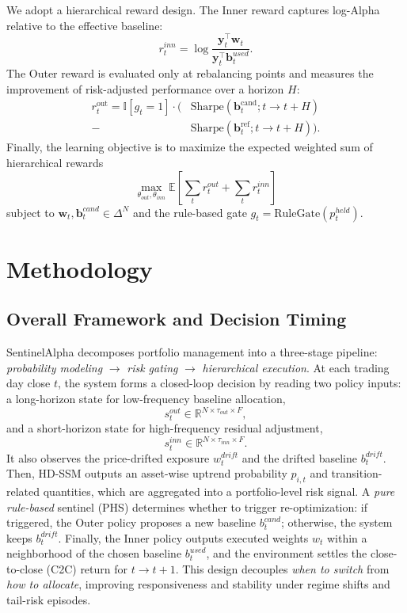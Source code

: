 \documentclass[letterpaper]{article} %
\begin{document}
We adopt a hierarchical reward design. The Inner reward captures log-Alpha relative to the effective baseline:
\begin{equation}
r_t^{inn}=\log\frac{\mathbf{y}_t^\top \mathbf{w}_t}{\mathbf{y}_t^\top \mathbf{b}^{used}_t}.
\end{equation}
The Outer reward is evaluated only at rebalancing points and measures the improvement of risk-adjusted performance over a horizon $H$:
\begin{equation}
\begin{split}
r_t^{\text{out}} = \mathbb{I}[g_t=1] \cdot \Big(
    &\mathrm{Sharpe}(\mathbf{b}_t^{\text{cand}}; t\!\to\!t+H) \\
    - &\mathrm{Sharpe}(\mathbf{b}_t^{\text{ref}}; t\!\to\!t+H)
\Big).
\end{split}
\end{equation}
Finally, the learning objective is to maximize the expected weighted sum of hierarchical rewards
\begin{equation}
\max_{\theta_{out},\theta_{inn}} \mathbb{E}\!\left[\sum_t r_t^{out}+\sum_t r_t^{inn}\right]
\end{equation}
subject to $\mathbf{w}_t,\mathbf{b}^{cand}_t\in\Delta^N$ and the rule-based gate $g_t=\mathrm{RuleGate}(p_t^{held})$.

\section{Methodology}
\subsection{Overall Framework and Decision Timing}
\label{sec:overall}

SentinelAlpha decomposes portfolio management into a three-stage pipeline:
\emph{probability modeling} $\rightarrow$ \emph{risk gating} $\rightarrow$ \emph{hierarchical execution}.
At each trading day close $t$, the system forms a closed-loop decision by reading two policy inputs:
a long-horizon state for low-frequency baseline allocation,
\begin{equation}
s_t^{out}\in\mathbb{R}^{N\times \tau_{out}\times F},
\end{equation}
and a short-horizon state for high-frequency residual adjustment,
\begin{equation}
s_t^{inn}\in\mathbb{R}^{N\times \tau_{inn}\times F}.
\end{equation}
It also observes the price-drifted exposure $w_t^{drift}$ and the drifted baseline $b_t^{drift}$.
Then, HD-SSM outputs an asset-wise uptrend probability $p_{i,t}$ and transition-related quantities,
which are aggregated into a portfolio-level risk signal.
A \emph{pure rule-based} sentinel (PHS) determines whether to trigger re-optimization:
if triggered, the Outer policy proposes a new baseline $b_t^{cand}$; otherwise, the system keeps $b_t^{drift}$.
Finally, the Inner policy outputs executed weights $w_t$ within a neighborhood of the chosen baseline $b_t^{used}$,
and the environment settles the close-to-close (C2C) return for $t\!\to\!t+1$.
This design decouples \emph{when to switch} from \emph{how to allocate}, improving responsiveness and stability under
regime shifts and tail-risk episodes.
\end{document}
